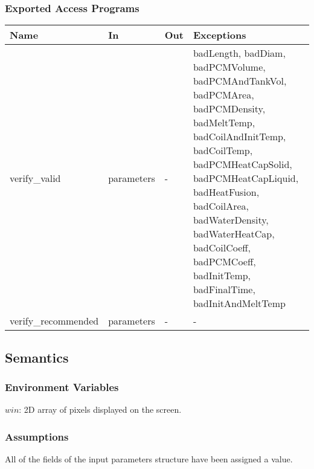 \documentclass[12pt]{article}
\begin{document}
\subsubsection{Exported Access Programs}
\begin{center}
\begin{tabular}{p{4cm} p{2cm} p{2cm} p{6cm}}
\hline
\textbf{Name} & \textbf{In} & \textbf{Out} & \textbf{Exceptions} \\
\hline
verify\_valid & parameters & - & badLength, badDiam, badPCMVolume, badPCMAndTankVol, badPCMArea, badPCMDensity, badMeltTemp, badCoilAndInitTemp, badCoilTemp, badPCMHeatCapSolid, badPCMHeatCapLiquid, badHeatFusion, badCoilArea, badWaterDensity, badWaterHeatCap, badCoilCoeff, badPCMCoeff, badInitTemp, badFinalTime, badInitAndMeltTemp \\
\hline
verify\_recommended & parameters & - & - \\
\hline
\end{tabular}
\end{center}
\subsection{Semantics}
\subsubsection{Environment Variables}
$win$: 2D array of pixels displayed on the screen.
\subsubsection{Assumptions}
All of the fields of the input parameters structure have been assigned a value.
\end{document}
